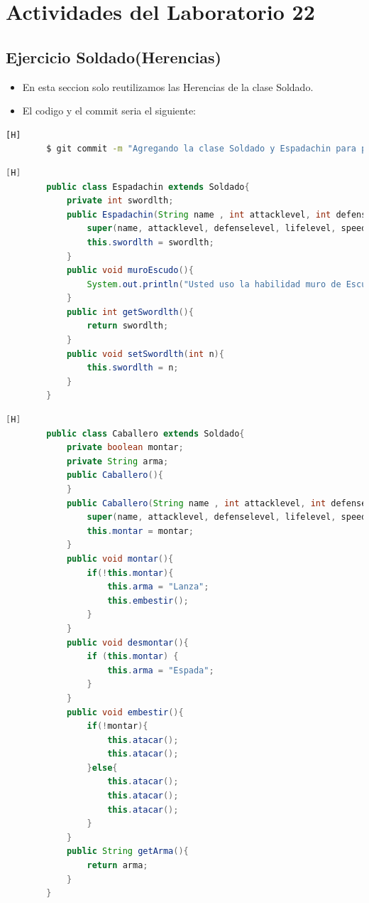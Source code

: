 \documentclass{article}
\begin{document}
	\section{Actividades del Laboratorio 22}

	\subsection{Ejercicio Soldado(Herencias)}
	\begin{itemize}	
		\item En esta seccion solo reutilizamos las Herencias de la clase Soldado.
		\item El codigo y el commit seria el siguiente:
	\end{itemize}	
	\begin{lstlisting}[language=bash,caption={Commit}][H]
		$ git commit -m "Agregando la clase Soldado y Espadachin para poder hacer el juego bueno solo en la clase espadachin usamos la herencia que nos deja la clase Soldado y tambien creamos la funcion muroEscudo() la cual devuelve como mensaje el uso de esta habilidad defensiva y los getters y setters"
	\end{lstlisting}	
	\begin{lstlisting}[language=java,caption={Las lineas de codigos de la clase Espadachin creada:}][H]
		public class Espadachin extends Soldado{
			private int swordlth;
			public Espadachin(String name , int attacklevel, int defenselevel, int lifelevel, int speed, String attitude ,boolean lives, int row, String column, int swordlth){
				super(name, attacklevel, defenselevel, lifelevel, speed, attitude, lives, row, column);
				this.swordlth = swordlth;
			}
			public void muroEscudo(){
				System.out.println("Usted uso la habilidad muro de Escudos");
			}
			public int getSwordlth(){
				return swordlth;
			}
			public void setSwordlth(int n){
				this.swordlth = n;
			}
		}
	\end{lstlisting}
	\begin{lstlisting}[language=java,caption={Las lineas de codigos de la clase Caballero creada:}][H]
		public class Caballero extends Soldado{
			private boolean montar;
			private String arma;
			public Caballero(){
			}
			public Caballero(String name , int attacklevel, int defenselevel, int lifelevel, int speed, String attitude ,boolean lives, int row, String column,boolean montar){
				super(name, attacklevel, defenselevel, lifelevel, speed, attitude, lives, row, column);
				this.montar = montar;
			}
			public void montar(){
				if(!this.montar){
					this.arma = "Lanza";
					this.embestir();
				}
			}
			public void desmontar(){
				if (this.montar) {
					this.arma = "Espada";
				}
			}
			public void embestir(){
				if(!montar){
					this.atacar();
					this.atacar();
				}else{
					this.atacar();
					this.atacar();
					this.atacar();
				}
			}
			public String getArma(){
				return arma;
			}
		}
	\end{lstlisting}
\end{document}
